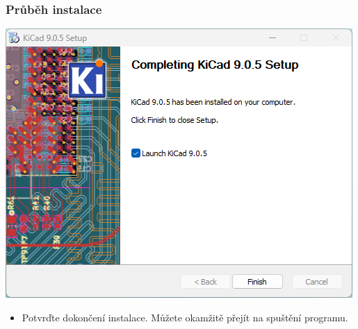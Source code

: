 \documentclass{beamer}
\begin{document}
	\begin{frame}
    \frametitle{Průběh instalace}
		\begin{center}
			\includegraphics[scale=0.5]{obr/kicad_inst6.png}
		\end{center}
		
		\begin{itemize}
			\item Potvrďte dokončení instalace. Můžete okamžitě přejít na spuštění programu.
		\end{itemize}
	\end{frame}
	
\end{document}
